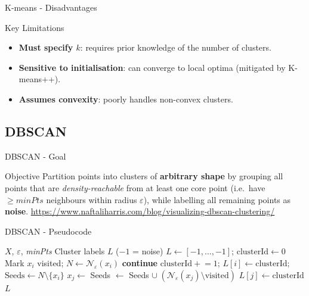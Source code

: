 \documentclass[aspectratio=169]{beamer}
\begin{document}
\begin{frame}{K-means - Disadvantages}

    \begin{alertblock}{Key Limitations}
    \begin{itemize}\small
        \item \textbf{Must specify $k$}: requires prior knowledge of the number of clusters.
        \item \textbf{Sensitive to initialisation}: can converge to local optima (mitigated by K-means++).
        \item \textbf{Assumes convexity}: poorly handles non-convex clusters.
    \end{itemize}
    \end{alertblock}

\end{frame}

\subsection{DBSCAN}

\begin{frame}{DBSCAN - Goal}
  \begin{block}{Objective}
    \centering\normalsize
    Partition points into clusters of \textbf{arbitrary shape} by grouping all points that are \emph{density-reachable} from at least one core point (i.e.\ have $\geq \mathit{minPts}$ neighbours within radius $\varepsilon$), while labelling all remaining points as \textbf{noise}.  \url{https://www.naftaliharris.com/blog/visualizing-dbscan-clustering/}
  \end{block}
\end{frame}

\begin{frame}{DBSCAN - Pseudocode}
  \begin{algorithm}[H]
    \footnotesize
    \caption{DBSCAN}
    \begin{algorithmic}[1]
      \Require $X$, $\varepsilon$, \textit{minPts}
      \Ensure Cluster labels $L$ ($-1$ = noise)
      \State $L \leftarrow [-1,\dots,-1]$; $\text{clusterId} \leftarrow 0$
        \State Mark $x_i$ visited; $N \leftarrow \mathcal{N}_\varepsilon(x_i)$
         \textbf{continue} 
        \EndIf
        \State $\text{clusterId} \mathrel{+}= 1$; $L[i] \leftarrow \text{clusterId}$; $\text{Seeds} \leftarrow N \setminus \{x_i\}$
          \State $x_j \leftarrow$ 
            \State Seeds $\leftarrow$ Seeds $\cup\; (\mathcal{N}_\varepsilon(x_j) \setminus \text{visited})$
          \EndIf
           $L[j] \leftarrow \text{clusterId}$ \EndIf
        \EndWhile
      \EndFor
      \Return $L$
    \end{algorithmic}
  \end{algorithm}
\end{frame}
\end{document}
